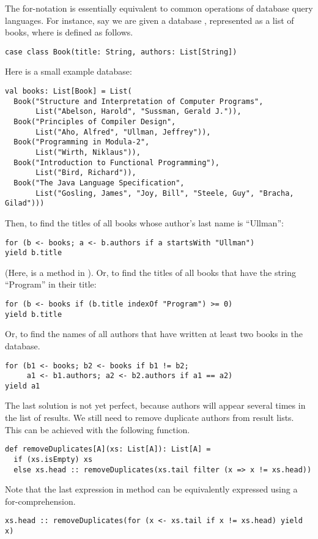 The for-notation is essentially equivalent to common operations of
database query languages.  For instance, say we are given a 
database , represented as a list of books, where
 is defined as follows.
\begin{lstlisting}
case class Book(title: String, authors: List[String])
\end{lstlisting}
Here is a small example database:
\begin{lstlisting}
val books: List[Book] = List(
  Book("Structure and Interpretation of Computer Programs",
       List("Abelson, Harold", "Sussman, Gerald J.")),
  Book("Principles of Compiler Design",
       List("Aho, Alfred", "Ullman, Jeffrey")),
  Book("Programming in Modula-2",
       List("Wirth, Niklaus")),
  Book("Introduction to Functional Programming"),
       List("Bird, Richard")),
  Book("The Java Language Specification",
       List("Gosling, James", "Joy, Bill", "Steele, Guy", "Bracha, Gilad")))
\end{lstlisting}
Then, to find the titles of all books whose author's last name is ``Ullman'':
\begin{lstlisting}
for (b <- books; a <- b.authors if a startsWith "Ullman")
yield b.title
\end{lstlisting}
(Here,  is a method in ).  Or,
to find the titles of all books that have the string ``Program'' in
their title:
\begin{lstlisting}
for (b <- books if (b.title indexOf "Program") >= 0)
yield b.title
\end{lstlisting}
Or, to find the names of all authors that have written at least two
books in the database.
\begin{lstlisting}
for (b1 <- books; b2 <- books if b1 != b2;
     a1 <- b1.authors; a2 <- b2.authors if a1 == a2)
yield a1
\end{lstlisting}
The last solution is not yet perfect, because authors will appear
several times in the list of results.  We still need to remove
duplicate authors from result lists.  This can be achieved with the
following function.
\begin{lstlisting}
def removeDuplicates[A](xs: List[A]): List[A] =
  if (xs.isEmpty) xs
  else xs.head :: removeDuplicates(xs.tail filter (x => x != xs.head))
\end{lstlisting}
Note that the last expression in method 
can be equivalently expressed using a for-comprehension.
\begin{lstlisting}
xs.head :: removeDuplicates(for (x <- xs.tail if x != xs.head) yield x)
\end{lstlisting}

